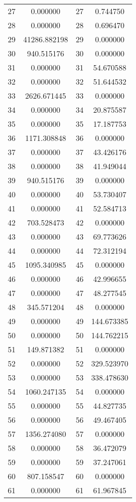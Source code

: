 \documentclass[12pt]{article}
\begin{document}
\begin{longtable}{@{}cccc@{}}
27 & 0.000000 & 27 & 0.744750 \\
28 & 0.000000 & 28 & 0.696470 \\
29 & 41286.882198 & 29 & 0.000000 \\
30 & 940.515176 & 30 & 0.000000 \\
31 & 0.000000 & 31 & 54.670588 \\
32 & 0.000000 & 32 & 51.644532 \\
33 & 2626.671445 & 33 & 0.000000 \\
34 & 0.000000 & 34 & 20.875587 \\
35 & 0.000000 & 35 & 17.187753 \\
36 & 1171.308848 & 36 & 0.000000 \\
37 & 0.000000 & 37 & 43.426176 \\
38 & 0.000000 & 38 & 41.949044 \\
39 & 940.515176 & 39 & 0.000000 \\
40 & 0.000000 & 40 & 53.730407 \\
41 & 0.000000 & 41 & 52.584713 \\
42 & 703.528473 & 42 & 0.000000 \\
43 & 0.000000 & 43 & 69.773626 \\
44 & 0.000000 & 44 & 72.312194 \\
45 & 1095.340985 & 45 & 0.000000 \\
46 & 0.000000 & 46 & 42.996655 \\
47 & 0.000000 & 47 & 48.277545 \\
48 & 345.571204 & 48 & 0.000000 \\
49 & 0.000000 & 49 & 144.673385 \\
50 & 0.000000 & 50 & 144.762215 \\
51 & 149.871382 & 51 & 0.000000 \\
52 & 0.000000 & 52 & 329.523970 \\
53 & 0.000000 & 53 & 338.478630 \\
54 & 1060.247135 & 54 & 0.000000 \\
55 & 0.000000 & 55 & 44.827735 \\
56 & 0.000000 & 56 & 49.467405 \\
57 & 1356.274080 & 57 & 0.000000 \\
58 & 0.000000 & 58 & 36.472079 \\
59 & 0.000000 & 59 & 37.247061 \\
60 & 807.158547 & 60 & 0.000000 \\
61 & 0.000000 & 61 & 61.967845 \\

\end{longtable}
\end{document}
